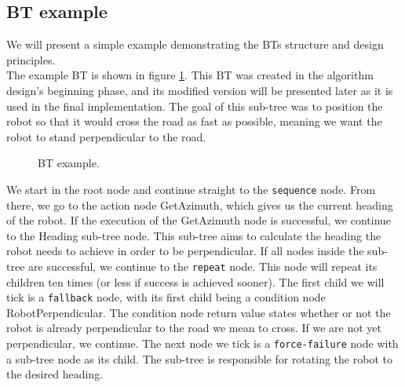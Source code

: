     \subsection{BT example}
        We will present a simple example demonstrating the BTs structure and design principles.\\
        The example BT is shown in figure \ref{fig:example_tree}. This BT was created in the algorithm design's beginning phase, and its modified version will be presented later as it is used in the final implementation. The goal of this sub-tree was to position the robot so that it would cross the road as fast as possible, meaning we want the robot to stand perpendicular to the road.
        \begin{figure}[H]
            \caption{BT example.}
            \label{fig:example_tree}
        \end{figure}
        We start in the root node and continue straight to the \texttt{sequence} node. From there, we go to the action node GetAzimuth, which gives us the current heading of the robot. If the execution of the GetAzimuth node is successful, we continue to the Heading sub-tree node. This sub-tree aims to calculate the heading the robot needs to achieve in order to be perpendicular. If all nodes inside the sub-tree are successful, we continue to the \texttt{repeat} node. This node will repeat its children ten times (or less if success is achieved sooner). The first child we will tick is a \texttt{fallback} node, with its first child being a condition node RobotPerpendicular. The condition node return value states whether or not the robot is already perpendicular to the road we mean to cross. If we are not yet perpendicular, we continue. The next node we tick is a \texttt{force-failure} node with a sub-tree node as its child. The sub-tree is responsible for rotating the robot to the desired heading.

